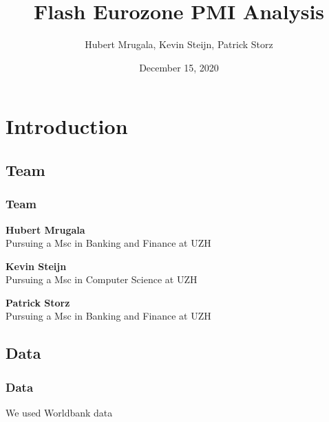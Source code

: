 \documentclass[10pt]{beamer}
\begin{document}
\title{Flash Eurozone PMI Analysis}
\author{Hubert Mrugala, Kevin Steijn, Patrick Storz}
\date{December 15, 2020}

\begin{frame}
\titlepage
\end{frame}
\section{Introduction}
\begin{frame}
\subsection{Team}
\frametitle{Team}

\textbf{Hubert Mrugala} \\
Pursuing a Msc in Banking and Finance at UZH

\vspace{3mm}

\textbf{Kevin Steijn} \\
Pursuing a Msc in Computer Science at UZH

\vspace{3mm}

\textbf{Patrick Storz} \\
Pursuing a Msc in Banking and Finance at UZH 

\end{frame}
\begin{frame}
\subsection{Data}
\frametitle{Data}

We used Worldbank data

\end{frame}
\end{document}
